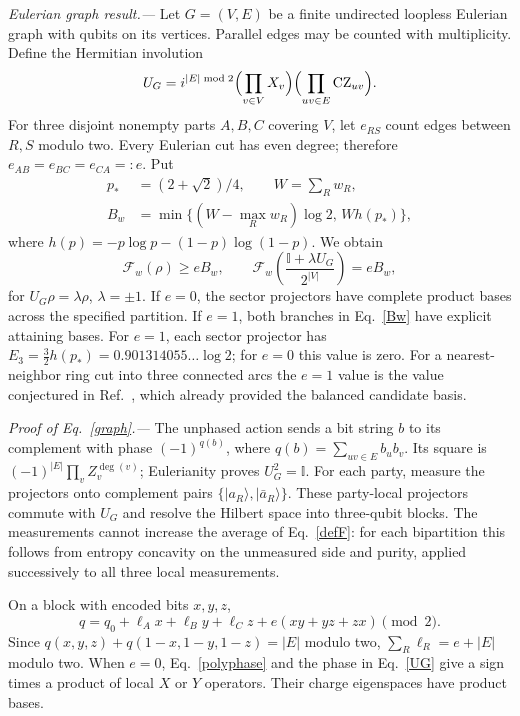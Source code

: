 \documentclass[aps,prl,reprint,nofootinbib]{revtex4-2}
\newcommand{\Id}{\mathbb I}
\newcommand{\CZ}{\operatorname{CZ}}
\newcommand{\F}{\mathcal F}
\begin{document}
\emph{Eulerian graph result.---} Let $G=(V,E)$ be a finite undirected
loopless Eulerian graph with qubits on its vertices. Parallel edges may
be counted with multiplicity. Define the Hermitian involution
\begin{equation}
 U_G=i^{|E|\bmod2}\Bigl(\prod_{v\in V}X_v\Bigr)
                         \Bigl(\prod_{uv\in E}\CZ_{uv}\Bigr).
 \label{UG}
\end{equation}
For three disjoint nonempty parts $A,B,C$ covering $V$, let $e_{RS}$
count edges between $R,S$ modulo two. Every Eulerian cut has even degree;
therefore $e_{AB}=e_{BC}=e_{CA}=:e$. Put
\begin{align}
 p_*&=(2+\sqrt2)/4,\qquad W=\sum_Rw_R,\nonumber\\
 B_w&=\min\{(W-\max_Rw_R)\log2,\,W h(p_*)\},
 \label{Bw}
\end{align}
where $h(p)=-p\log p-(1-p)\log(1-p)$. We obtain
\begin{equation}
 \F_w(\rho)\ge eB_w,\qquad
 \F_w\!\left(\frac{\Id+\lambda U_G}{2^{|V|}}\right)=eB_w,
 \label{graph}
\end{equation}
for $U_G\rho=\lambda\rho$, $\lambda=\pm1$. If $e=0$, the sector
projectors have complete product bases across the specified partition.
If $e=1$, both branches in Eq.~\eqref{Bw} have explicit attaining bases.
For $e=1$, each sector projector has
$E_3=\frac32h(p_*)=0.901314055\ldots\log2$; for $e=0$ this value is zero.
For a nearest-neighbor ring cut into three connected arcs the $e=1$ value
is the value conjectured in Ref.~\cite{LCW}, which already provided the
balanced candidate basis.

\emph{Proof of Eq.~\eqref{graph}.---} The unphased action sends a bit
string $b$ to its complement with phase $(-1)^{q(b)}$, where
$q(b)=\sum_{uv\in E}b_ub_v$. Its square is
$(-1)^{|E|}\prod_vZ_v^{\deg(v)}$; Eulerianity proves $U_G^2=\Id$.
For each party, measure the projectors onto complement pairs
$\{|a_R\rangle,|\bar a_R\rangle\}$. These party-local projectors
commute with $U_G$ and resolve the Hilbert space into three-qubit blocks.
The measurements cannot increase the average of Eq.~\eqref{defF}: for
each bipartition this follows from entropy concavity on the unmeasured
side and purity, applied successively to all three local measurements.

On a block with encoded bits $x,y,z$,
\begin{equation}
 q=q_0+\ell_Ax+\ell_By+\ell_Cz+e(xy+yz+zx)\pmod2.
 \label{polyphase}
\end{equation}
Since $q(x,y,z)+q(1-x,1-y,1-z)=|E|$ modulo two,
$\sum_R\ell_R=e+|E|$ modulo two. When $e=0$, Eq.~\eqref{polyphase} and
the phase in Eq.~\eqref{UG} give a sign times a product of local $X$ or
$Y$ operators. Their charge eigenspaces have product bases.
\end{document}
